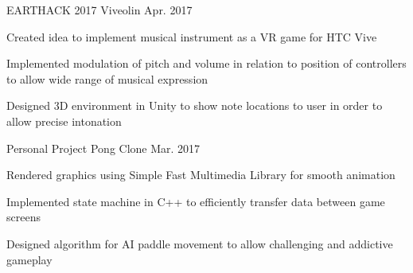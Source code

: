 

\begin{cventries}

  \cventry
    {EARTHACK 2017} %
    {Viveolin} %
    {} %
    {Apr. 2017} %
    {
      \begin{cvitems} %
        \item {Created idea to implement musical instrument as a VR game for HTC Vive}
        \item {Implemented modulation of pitch and volume in relation to position of controllers to allow wide range of musical expression}
        \item {Designed 3D environment in Unity to show note locations to user in order to allow precise intonation}
      \end{cvitems}
    }

  \cventry
    {Personal Project} %
    {Pong Clone} %
    {} %
    {Mar. 2017} %
    {
      \begin{cvitems} %
        \item {Rendered graphics using Simple Fast Multimedia Library for smooth animation}
        \item {Implemented state machine in C++ to efficiently transfer data between game screens}
        \item {Designed algorithm for AI paddle movement to allow challenging and addictive gameplay}
      \end{cvitems}
    }

\end{cventries}
